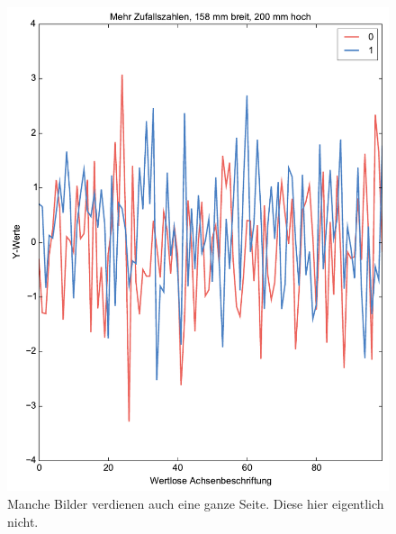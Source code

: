 \begin{figure}
\includegraphics[scale=1]{Pictures/ganzseitig}
\caption{Manche Bilder verdienen auch eine ganze Seite. Diese hier eigentlich nicht.}
\label{fig:sinnvolles_label3}
\end{figure}

\Blindtext